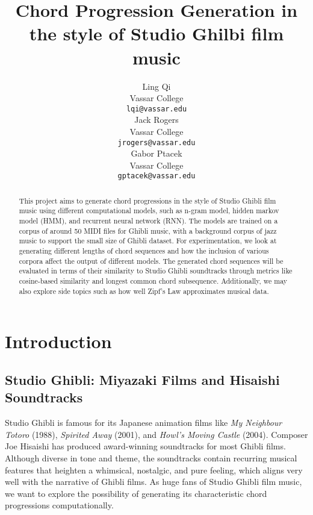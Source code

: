 \documentclass[11pt,a4paper]{article}
\title{Chord Progression Generation in the style of Studio Ghilbi film music}
\author{Ling Qi \\
  Vassar College \\
  \texttt{lqi@vassar.edu} \\\And
  Jack Rogers \\
  Vassar College\\
  \texttt{jrogers@vassar.edu} \\\And
  Gabor Ptacek \\
  Vassar College\\
  \texttt{gptacek@vassar.edu} \\}
\date{}
\begin{document}
\maketitle
\begin{abstract}
This project aims to generate chord progressions in the style of Studio Ghibli film music using different computational models, such as n-gram model, hidden markov model (HMM), and recurrent neural network (RNN). The models are trained on a corpus of around 50 MIDI files for Ghibli music, with a background corpus of jazz music to support the small size of Ghibli dataset. For experimentation, we look at generating different lengths of chord sequences and how the inclusion of various corpora affect the output of different models. The generated chord sequences will be evaluated in terms of their similarity to Studio Ghibli soundtracks through metrics like cosine-based similarity and longest common chord subsequence. Additionally, we may also explore side topics such as how well Zipf’s Law approximates musical data.
\end{abstract}

\section{Introduction}
\subsection{Studio Ghibli: Miyazaki Films and Hisaishi Soundtracks}
Studio Ghibli is famous for its Japanese animation films like \emph{My Neighbour Totoro} (1988), \emph{Spirited Away} (2001), and \emph{Howl’s Moving Castle} (2004). Composer Joe Hisaishi has produced award-winning soundtracks for most Ghibli films. Although diverse in tone and theme, the soundtracks contain recurring musical features that heighten a whimsical, nostalgic, and pure feeling, which aligns very well with the narrative of Ghibli films. As huge fans of Studio Ghibli film music, we want to explore the possibility of generating its characteristic chord progressions computationally.
\end{document}
